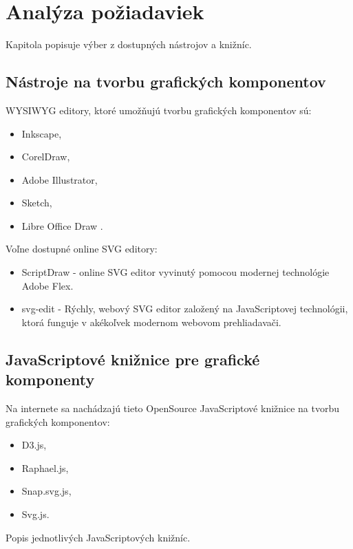 \chapter{Analýza požiadaviek}
Kapitola popisuje výber z dostupných nástrojov a knižníc. 

\section{Nástroje na tvorbu grafických komponentov}

\acs{WYSIWYG} editory, ktoré umožňujú tvorbu grafických komponentov sú: 

\begin{itemize}
\item Inkscape,
\item CorelDraw, 
\item  Adobe Illustrator, 
\item Sketch, 
\item Libre Office Draw .
\end{itemize}

Voľne dostupné online SVG editory: 
\begin{itemize}
	\item ScriptDraw - online SVG editor vyvinutý pomocou modernej technológie Adobe Flex.
	
	\item svg-edit - Rýchly, webový SVG editor založený na JavaScriptovej technológii, ktorá funguje v akékoľvek modernom webovom prehliadavači. 
	
\end{itemize}



\section{JavaScriptové knižnice pre grafické komponenty}
Na internete sa nachádzajú tieto OpenSource JavaScriptové knižnice na tvorbu grafických komponentov: 
\begin{itemize}
	\item \acs{D3}.js, 
	\item Raphael.js, 
	\item Snap.svg.js,  
	\item Svg.js. 
\end{itemize}



Popis jednotlivých JavaScriptových knižníc.

